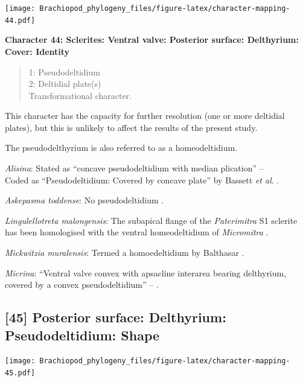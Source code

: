 \documentclass[openany]{book}
\theoremstyle{definition}
\theoremstyle{definition}
\theoremstyle{definition}
\theoremstyle{remark}
\begin{document}
\texttt{[image: Brachiopod\_phylogeny\_files/figure-latex/character-mapping-44.pdf]}

\textbf{Character 44: Sclerites: Ventral valve: Posterior surface:
Delthyrium: Cover: Identity}

\begin{quote}
1: Pseudodeltidium\\
2: Deltidial plate(s)\\
Transformational character.
\end{quote}

This character has the capacity for further resolution (one or more
deltidial plates), but this is unlikely to affect the results of the
present study.

The pseudodelthyrium is also referred to as a homeodeltidium.

\hypertarget{Alisina-coding-44}{}
\emph{Alisina}: Stated as ``concave pseudodeltidium with median
plication'' -- \citet{Williams2000LinguliformeaCraniiformea}\\
Coded as ``Pseudodeltidium: Covered by concave plate'' by Bassett
\emph{et al}. \citeyearpar{Bassett2001Functionalmorphology}.

\hypertarget{Askepasma_toddense-coding-44}{}
\emph{Askepasma toddense}: No pseudodeltidium
\citep[p.~153]{Williams2000LinguliformeaCraniiformea}.

\hypertarget{Lingulellotreta_malongensis-coding-44}{}
\emph{Lingulellotreta malongensis}: The subapical flange of the
\emph{Paterimitra} S1 sclerite has been homologised with the ventral
homeodeltidium of \emph{Micromitra} \citep{Larsson2014iPaterimitra}.

\hypertarget{Mickwitzia_muralensis-coding-44}{}
\emph{Mickwitzia muralensis}: Termed a homoedeltidium by Balthasar
\citeyearpar{Balthasar2004Shellstructure}.

\hypertarget{Micrina-coding-44}{}
\emph{Micrina}: ``Ventral valve convex with apsacline interarea bearing
delthyrium, covered by a convex pseudodeltidium'' --
\citet{Holmer2008TheEarly}.

\subsection*{{[}45{]} Posterior surface: Delthyrium: Pseudodeltidium:
Shape}\label{posterior-surface-delthyrium-pseudodeltidium-shape}

\texttt{[image: Brachiopod\_phylogeny\_files/figure-latex/character-mapping-45.pdf]}
\end{document}
